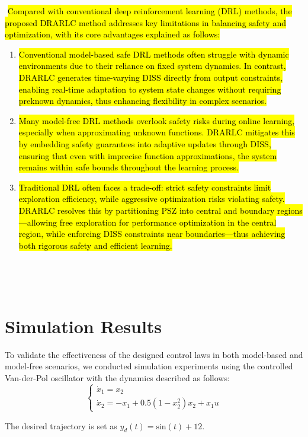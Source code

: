 \documentclass[preprint,12pt]{elsarticle}
\begin{document}
\begin{rmk}​
\hl{Compared with conventional deep reinforcement learning (DRL) methods, the proposed DRARLC method addresses key limitations in balancing safety and optimization, with its core advantages explained as follows:}​
\begin{enumerate}​
\item \hl{Conventional model-based safe DRL methods often struggle with dynamic environments due to their reliance on fixed system dynamics. In contrast, DRARLC generates time-varying DISS directly from output constraints, enabling real-time adaptation to system state changes without requiring preknown dynamics, thus enhancing flexibility in complex scenarios.}​
\item \hl{Many model-free DRL methods overlook safety risks during online learning, especially when approximating unknown functions. DRARLC mitigates this by embedding safety guarantees into adaptive updates through DISS, ensuring that even with imprecise function approximations, the system remains within safe bounds throughout the learning process.}​
\item \hl{Traditional DRL often faces a trade-off: strict safety constraints limit exploration efficiency, while aggressive optimization risks violating safety. DRARLC resolves this by partitioning PSZ into central and boundary regions—allowing free exploration for performance optimization in the central region, while enforcing DISS constraints near boundaries—thus achieving both rigorous safety and efficient learning.}​
\end{enumerate}​
\end{rmk}​


\section{Simulation Results}

To validate the effectiveness of the designed control laws in both model-based and model-free scenarios, we conducted simulation experiments using the controlled Van-der-Pol oscillator with the dynamics described as follows\hl{\cite{8989956}}:
\[
    \begin{cases} 
        \dot{x}_1 = x_2 \\
        \dot{x}_2 = -x_1 + 0.5(1-x_2^2)x_2 + x_1 u
    \end{cases} 
\]

The desired trajectory is set as \(y_d(t) = \mathrm{sin}(t) + 12\).
\end{document}
